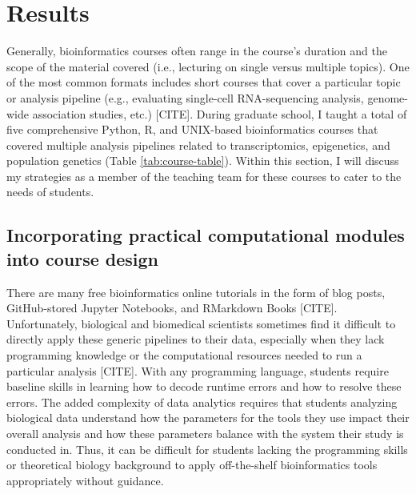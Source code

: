 \section{Results}

Generally, bioinformatics courses often range in the course’s duration and the scope of the material covered (i.e., lecturing on single versus multiple topics). One of the most common formats includes short courses that cover a particular topic or analysis pipeline (e.g., evaluating single-cell RNA-sequencing analysis, genome-wide association studies, etc.) [CITE]. During graduate school, I taught a total of five comprehensive Python, R, and UNIX-based bioinformatics courses that covered multiple analysis pipelines related to transcriptomics, epigenetics, and population genetics (Table \ref{tab:course-table}). Within this section, I will discuss my strategies as a member of the teaching team for these courses to cater to the needs of students.

\subsection{Incorporating practical computational modules into course design}

There are many free bioinformatics online tutorials in the form of blog posts, GitHub-stored Jupyter Notebooks, and RMarkdown Books [CITE]. Unfortunately, biological and biomedical scientists sometimes find it difficult to directly apply these generic pipelines to their data, especially when they lack programming knowledge or the computational resources needed to run a particular analysis [CITE]. With any programming language, students require baseline skills in learning how to decode runtime errors and how to resolve these errors. The added complexity of data analytics requires that students analyzing biological data understand how the parameters for the tools they use impact their overall analysis and how these parameters balance with the system their study is conducted in. Thus, it can be difficult for students lacking the programming skills or theoretical biology background to apply off-the-shelf bioinformatics tools appropriately without guidance. 

